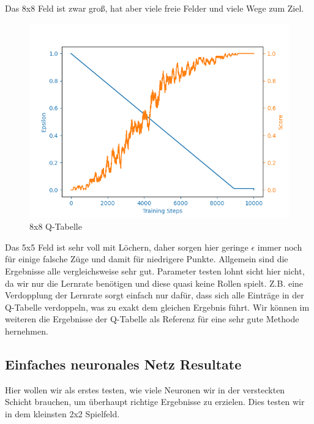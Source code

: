 Das 8x8 Feld ist zwar groß, hat aber viele freie Felder und viele Wege zum Ziel.

\begin{figure}[H]
\centering
\includegraphics[width=\textwidth]{Figures/q_table_8x8.png}
\caption{8x8 Q-Tabelle}
\label{q3}
\end{figure}

Das 5x5 Feld ist sehr voll mit Löchern, daher sorgen hier geringe $\epsilon$ immer noch für einige falsche Züge und damit für niedrigere Punkte. Allgemein sind die Ergebnisse alle vergleichsweise sehr gut. Parameter testen lohnt sicht hier nicht, da wir nur die Lernrate benötigen und diese quasi keine Rollen spielt. Z.B. eine Verdopplung der Lernrate sorgt einfach nur dafür, dass sich alle Einträge in der Q-Tabelle verdoppeln, was zu exakt dem gleichen Ergebnis führt. Wir können im weiteren die Ergebnisse der Q-Tabelle als Referenz für eine sehr gute Methode hernehmen.

\subsection{Einfaches neuronales Netz Resultate}
\label{subsec:dn_r}

Hier wollen wir als erstes testen, wie viele Neuronen wir in der versteckten Schicht brauchen, um überhaupt richtige Ergebnisse zu erzielen. Dies testen wir in dem kleinsten 2x2 Spielfeld.

